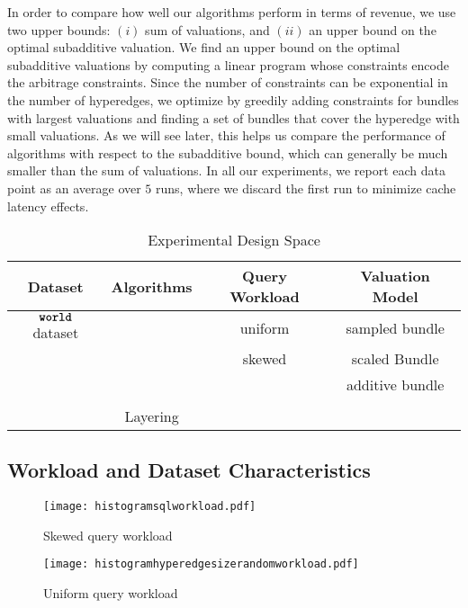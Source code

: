In order to compare how well our algorithms perform in terms of revenue, we use two upper 
bounds: $(i)$ sum of valuations, and $(ii)$ an upper bound on the optimal subadditive valuation. We find an upper bound on the optimal subadditive valuations by computing a linear program whose constraints encode the arbitrage constraints. Since the number of constraints can be exponential in the number of hyperedges, we optimize by greedily adding constraints for bundles with largest valuations and finding a set of bundles that cover the hyperedge with small valuations. As we will see later, this helps us compare the performance of algorithms with respect to the subadditive bound, which can
generally be much smaller than the sum of valuations. 
In all our experiments, we report each data point as an average over $5$ runs, where we discard the first run to minimize cache latency effects. 

\begin{table*} \centering
	\def\arraystretch{1.35}%
	\begin{tabular}{c|c|c|c}
		\toprule
		\textbf{Dataset} & \textbf{Algorithms} & \textbf{Query Workload} & \textbf{Valuation Model}\\ \midrule
		$\texttt{\bfseries world}$ dataset & \ubp & uniform & sampled bundle  \\ 
		& \uip & skewed & scaled Bundle  \\ 
		& \lpip &  & additive bundle  \\ 
		& \cip & &  \\
		& Layering &  &  \\
		\bottomrule
	\end{tabular}
	\caption{Experimental Design Space}
	\label{table:experiments}
\end{table*}

\subsection{Workload and Dataset Characteristics}

\begin{figure}[!h]
	\begin{minipage}[t]{0.49\linewidth} 
		\centering
		\texttt{[image: histogramsqlworkload.pdf]}
		\caption{Skewed query workload} \label{fig:histogramrealqueries}
	\end{minipage}       	
	\begin{minipage}[t]{0.47\linewidth}
		\centering
		\texttt{[image: histogramhyperedgesizerandomworkload.pdf]}
		\caption{Uniform query workload} \label{fig:histogramrandom}
	\end{minipage} 
\end{figure}  

